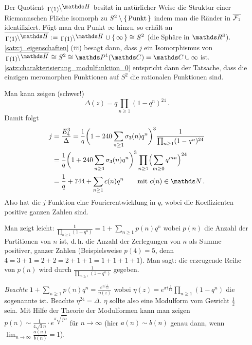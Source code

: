 \begin{beme-list}
	\item Der Quotient $\linksmodulo{\Gamma(1)}{\HH}$ besitzt in natürlicher Weise die Struktur einer Riemannschen Fläche isomorph zu $S^2 \setminus\left\{\,\text{Punkt}\,\right\}$ indem man die Ränder in $\overline{\mathcal{F}_1}$ identifiziert.
	Fügt man den Punkt $\infty$ hinzu, so erhält an $\closure{\linksmodulo{\Gamma(1)}{\HH}} := \linksmodulo{\Gamma(1)}{\HH} \cup \Set{\infty} \cong S^2$ (die Sphäre in $\RR^3$).
	\autoref{satz:j_eigenschaften} (iii) besagt dann, dass $j$ ein Isomorphismus von $\closure{\linksmodulo{\Gamma(1)}{\HH}} \cong S^2 \cong \mathds P^1(\CC) = \CC \cup \infty$ ist.
	\autoref{satz:charakterisierung_modulfunktion_0} entspricht dann der Tatsache, dass die einzigen meromorphen Funktionen auf $S^2$ die rationalen Funktionen sind.
	
	\item Man kann zeigen (schwer!)
	\[
	\Delta(z) = q \prod_{n\geq1} (1-q^n)^{24}
	\,.
	\]
	Damit folgt
	\begin{align*}
	j
	&= \frac{E_4^3}{\Delta}
	= \frac{1}{q} \biggl(1 + 240\sum_{n\geq1} \sigma_3(n)q^n\biggr)^3 \frac{1}{\prod_{n\geq1} (1 - q^n)^{24}} \\
	&= \frac{1}{q} \biggl(1 + 240\sum_{n\geq1} \sigma_3(n)q^n\biggr)^3 \prod_{n\geq1} \Bigl(\sum_{m\geq0} q^{mn}\Bigr)^{24} \\
	&= \frac{1}{q} + 744 + \sum_{n \geq 1} c(n)q^n \qquad \text{mit } c(n) \in \NN
	\,.
	\end{align*}
	Also hat die $j$-Funktion eine Fourierentwicklung in $q$, wobei die Koeffizienten positive ganzen Zahlen sind.
	
	\item Man zeigt leicht: $\frac{1}{\prod_{n\geq1} (1-q^n)} = 1 + \sum_{n\geq1} p(n)q^n$ wobei $p(n)$ die Anzahl der Partitionen von $n$ ist, d.\,h. die Anzahl der Zerlegungen von $n$ als Summe positiver, ganzer Zahlen (Beispielsweise $p(4) = 5$, denn $4 = 3 + 1 = 2 + 2 = 2 + 1 + 1 = 1 + 1 + 1 + 1$).
	Man sagt: die erzeugende Reihe von $p(n)$ wird durch $\frac{1}{\prod_{m\geq1} (1-q^n)}$ gegeben.
	
	\emph{Beachte} $1 + \sum_{n\geq1} p(n)q^n = \frac{e^{\pi i\frac{z}{12}}}{\eta(z)}$ wobei $\eta(z) = e^{\pi i\frac{z}{12}} \prod_{n\geq1} (1-q^n)$ die sogenannte  ist.
	Beachte $\eta^{24} = \Delta$.
	$\eta$ sollte also eine Modulform vom Gewicht $\frac{1}{2}$ sein.
	Mit Hilfe der Theorie der Modulformen kann man zeigen $p(n) \sim \frac{1}{4\sqrt 3 n} \cdot e^{\pi \sqrt{\frac{3}{2}n}}$ für $n\to\infty$ (hier $a(n) \sim b(n)$ genau dann, wenn $\lim_{n\to\infty} \frac{a(n)}{b(n)} = 1$).
\end{beme-list}